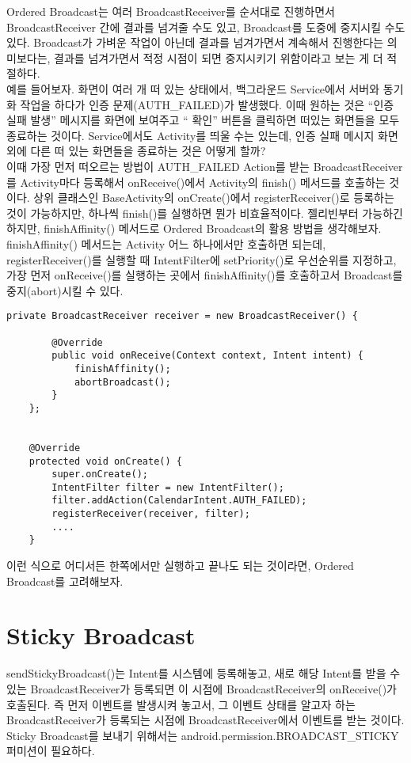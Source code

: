 Ordered Broadcast는 여러 BroadcastReceiver를 순서대로 진행하면서  BroadcastReceiver 간에 결과를 넘겨줄 수도 있고, Broadcast를 도중에 중지시킬 수도 있다. Broadcast가 가벼운 작업이 아닌데 결과를 넘겨가면서 계속해서 진행한다는 의미보다는, 결과를 넘겨가면서 적정 시점이 되면 중지시키기 위함이라고 보는 게 더 적절하다.\\

예를 들어보자. 화면이 여러 개 떠 있는 상태에서, 백그라운드 Service에서 서버와 동기화 작업을 하다가 인증 문제(AUTH\_FAILED)가 발생했다. 이때 원하는 것은 ``인증 실패 발생'' 메시지를 화면에 보여주고 `` 확인'' 버튼을 클릭하면 떠있는 화면들을 모두 종료하는 것이다.
Service에서도 Activity를 띄울 수는 있는데, 인증 실패 메시지 화면 외에 다른 떠 있는 화면들을 종료하는 것은 어떻게 할까?\\

이때 가장 먼저 떠오르는 방법이 AUTH\_FAILED Action를 받는 BroadcastReceiver를 Activity마다 등록해서 onReceive()에서 Activity의 finish() 메서드를 호출하는 것이다.
상위 클래스인 BaseActivity의 onCreate()에서 registerReceiver()로 등록하는 것이 가능하지만, 하나씩 finish()를 실행하면 뭔가 비효율적이다. 젤리빈부터 가능하긴 하지만, finishAffinity() 메서드로 Ordered Broadcast의 활용 방법을 생각해보자.\\

finishAffinity() 메서드는 Activity 어느 하나에서만 호출하면 되는데, registerReceiver()를 실행할 때 IntentFilter에 setPriority()로 우선순위를 지정하고, 가장 먼저 onReceive()를 실행하는 곳에서 finishAffinity()를 호출하고서 Broadcast를 중지(abort)시킬 수 있다.

\begin{lstlisting}[frame=single] 
	private BroadcastReceiver receiver = new BroadcastReceiver() {
		
		@Override
		public void onReceive(Context context, Intent intent) {
			finishAffinity();
			abortBroadcast();
		}
	};
	

	@Override
	protected void onCreate() {
		super.onCreate();
		IntentFilter filter = new IntentFilter();
		filter.addAction(CalendarIntent.AUTH_FAILED);
		registerReceiver(receiver, filter);
		....
	}
\end{lstlisting}
이런 식으로 어디서든 한쪽에서만 실행하고 끝나도 되는 것이라면, Ordered Broadcast를 고려해보자.\\

\section{Sticky Broadcast}
sendStickyBroadcast()는 Intent를 시스템에 등록해놓고, 새로 해당 Intent를 받을 수 있는 BroadcastReceiver가 등록되면 이 시점에 BroadcastReceiver의 onReceive()가 호출된다. 즉 먼저 이벤트를 발생시켜 놓고서, 그 이벤트 상태를 알고자 하는 BroadcastReceiver가 등록되는 시점에 BroadcastReceiver에서 이벤트를 받는 것이다.
Sticky Broadcast를 보내기 위해서는 android.permission.BROADCAST\_STICKY 퍼미션이 필요하다.\\

